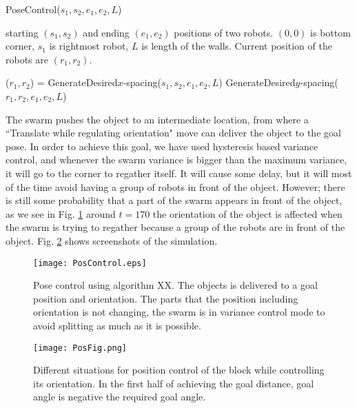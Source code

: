 \begin{algorithm}
\caption{PoseControl($s_1,s_2,e_1,e_2,L$)}\label{alg:PoseControl}
\begin{algorithmic}[1]
\Require starting $(s_1,s_2)$ and ending $(e_1,e_2)$ positions of  two robots. 
$(0,0)$ is bottom corner, $s_1$ is rightmost robot, 
 $L$ is length of the walls. 
 Current position of the robots are $(r_1,r_2)$.

\State ($r_1,r_2$) = GenerateDesired$x$-spacing($s_1,s_2,e_1,e_2,L$)
\State GenerateDesired$y$-spacing($r_1,r_2,e_1,e_2,L$)

\end{algorithmic}
\end{algorithm}



The swarm pushes the object to an intermediate location, from where a ``Translate while regulating orientation" move can deliver the object to the goal pose. 
In order to achieve this goal, we have used hysteresis based variance control, and whenever the swarm variance is bigger than the maximum variance, it will go to the corner to regather itself. 
It will cause some delay, but it will most of the time avoid having a group of robots in front of the object. However; there is still some probability that a part of the swarm appears in front of the object, as we see in Fig. \ref{fig:PosControlFig} around $t=170$ the orientation of the object is affected when the swarm is trying to regather because a group of the robots are in front of the object. Fig. \ref{fig:PosScreenShot} shows screenshots of the simulation.

\begin{figure}
\begin{center}
	\texttt{[image: PosControl.eps]}
\end{center}
\vspace{-2em}
\caption{\label{fig:PosControlFig} 
Pose control using algorithm XX.  The objects is delivered to a goal position and orientation. The parts that the position including orientation is not changing, the swarm is in variance control mode to avoid splitting as much as it is possible. 
}
\vspace{-1em}
\end{figure}

\begin{figure}
\begin{center}
	\texttt{[image: PosFig.png]}
\end{center}
\vspace{-1em}
\caption{\label{fig:PosScreenShot}
Different situations for position control of the block while controlling its orientation. In the first half of achieving the goal distance, goal angle is negative the required goal angle.
}
\vspace{-1em}
\end{figure}


